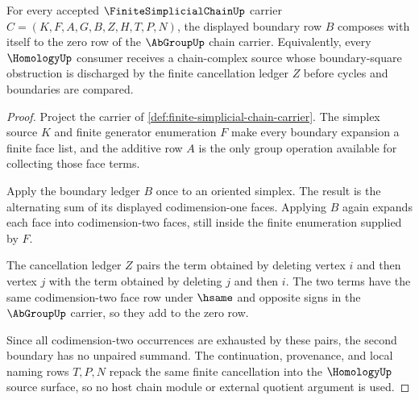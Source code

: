 \begin{theorem}
\label{thm:finite-simplicial-chain-boundary-square-zero}
For every accepted $\FiniteSimplicialChainUp$ carrier $C=(K,F,A,G,B,Z,H,T,P,N)$, the displayed boundary row $B$ composes with itself to the zero row of the $\AbGroupUp$ chain carrier. Equivalently, every $\HomologyUp$ consumer receives a chain-complex source whose boundary-square obstruction is discharged by the finite cancellation ledger $Z$ before cycles and boundaries are compared.
\end{theorem}
\begin{proof}
Project the carrier of \autoref{def:finite-simplicial-chain-carrier}. The simplex source $K$ and finite generator enumeration $F$ make every boundary expansion a finite face list, and the additive row $A$ is the only group operation available for collecting those face terms.

Apply the boundary ledger $B$ once to an oriented simplex. The result is the alternating sum of its displayed codimension-one faces. Applying $B$ again expands each face into codimension-two faces, still inside the finite enumeration supplied by $F$.

The cancellation ledger $Z$ pairs the term obtained by deleting vertex $i$ and then vertex $j$ with the term obtained by deleting $j$ and then $i$. The two terms have the same codimension-two face row under $\hsame$ and opposite signs in the $\AbGroupUp$ carrier, so they add to the zero row.

Since all codimension-two occurrences are exhausted by these pairs, the second boundary has no unpaired summand. The continuation, provenance, and local naming rows $T,P,N$ repack the same finite cancellation into the $\HomologyUp$ source surface, so no host chain module or external quotient argument is used.
\end{proof}



